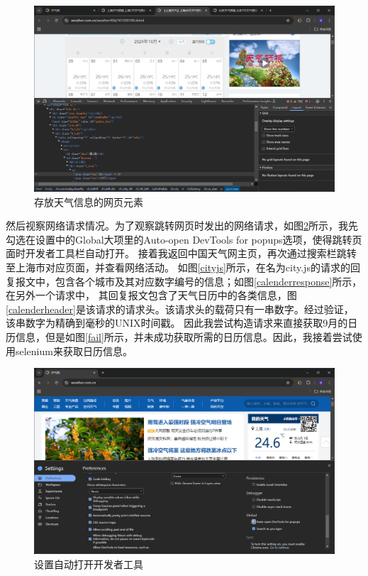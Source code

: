\begin{figure}[!htbp]
    \centering
    \includegraphics[width=\textwidth]{figures/inspect_calendar.png}
    \caption{存放天气信息的网页元素}\label{inspectcalendar}
\end{figure}

然后视察网络请求情况。为了观察跳转网页时发出的网络请求，如图\ref{activate}所示，我先勾选在设置中的Global大项里的Auto-open DevTools for popups选项，使得跳转页面时开发者工具栏自动打开。
接着我返回中国天气网主页，再次通过搜索栏跳转至上海市对应页面，并查看网络活动。
如图\ref{cityjs}所示，在名为city.js的请求的回复报文中，包含各个城市及其对应数字编号的信息；如图\ref{calenderresponse}所示，在另外一个请求中，
其回复报文包含了天气日历中的各类信息，图\ref{calenderheader}是该请求的请求头。该请求头的载荷只有一串数字。经过验证，该串数字为精确到毫秒的UNIX时间戳。
因此我尝试构造请求来直接获取9月的日历信息，但是如图\ref{fail}所示，并未成功获取所需的日历信息。因此，我接着尝试使用selenium来获取日历信息。

\begin{figure}[!htbp]
    \centering
    \includegraphics[width=\textwidth]{figures/activate.png}
    \caption{设置自动打开开发者工具}\label{activate}
\end{figure}

